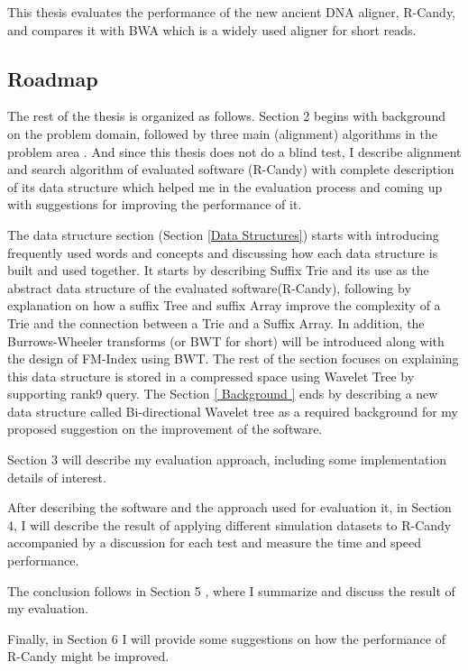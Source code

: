 \documentclass[11pt,a4paper]{report}
\begin{document}
This thesis evaluates the performance of the new ancient DNA aligner,
R-Candy, and compares it with BWA which is a widely used aligner for
short reads.




\subsection{Roadmap} \label{Roadmap}


The rest of the thesis is organized as follows.
Section 2 begins with background on the problem domain, followed by three main 
(alignment) algorithms in the problem area  . And since this thesis does not do
a blind test, I describe alignment and search algorithm of evaluated software 
(R-Candy) with complete description of its data structure which helped me in the 
evaluation process and coming up with suggestions for improving the performance
of it.

The data structure section (Section \ref{Data Structures}) starts with introducing 
frequently used words and concepts and discussing how each data structure is 
built and used together. It starts by describing Suffix Trie and its use as the
abstract data structure of the evaluated software(R-Candy), following by 
explanation on  how a suffix Tree and suffix Array improve the complexity of a 
Trie and the connection between a Trie and a Suffix Array. In addition, the
Burrows-Wheeler transforms (or BWT for short) will be introduced along with the
design of FM-Index using BWT. The rest of the section focuses on explaining this 
data structure  is stored in a compressed space using Wavelet Tree by supporting
rank9 query. The Section \ref{ Background } ends by describing a new data structure 
called Bi-directional Wavelet tree as a required background for my proposed 
suggestion on the improvement of the software.

Section 3 will describe my evaluation approach, including some implementation 
details of interest.

After describing the software and the approach used for evaluation it, in 
Section 4, I will describe the result of applying different simulation datasets
to R-Candy accompanied by a discussion for each test and measure the time and 
speed performance.

The conclusion follows in Section 5 , where I summarize and discuss the result 
of my evaluation.

Finally, in Section 6 I will provide some suggestions on how the performance of
R-Candy might be improved. 
\end{document}
